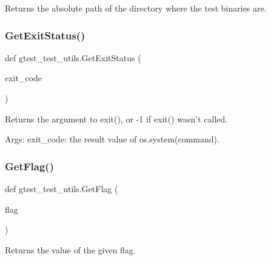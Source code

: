 \begin{DoxyVerb}Returns the absolute path of the directory where the test binaries are.\end{DoxyVerb}
 \mbox{\label{namespacegtest__test__utils_acf8280de4dc027a28ffc9de43f245b50}} 
\subsubsection{\texorpdfstring{Get\+Exit\+Status()}{GetExitStatus()}}
{\footnotesize\ttfamily def gtest\+\_\+test\+\_\+utils.\+Get\+Exit\+Status (\begin{DoxyParamCaption}\item[{}]{exit\+\_\+code }\end{DoxyParamCaption})}

\begin{DoxyVerb}Returns the argument to exit(), or -1 if exit() wasn't called.

Args:
  exit_code: the result value of os.system(command).
\end{DoxyVerb}
 \mbox{\label{namespacegtest__test__utils_a052da74a5e39162480daf3a4d8eff9a6}} 
\subsubsection{\texorpdfstring{Get\+Flag()}{GetFlag()}}
{\footnotesize\ttfamily def gtest\+\_\+test\+\_\+utils.\+Get\+Flag (\begin{DoxyParamCaption}\item[{}]{flag }\end{DoxyParamCaption})}

\begin{DoxyVerb}Returns the value of the given flag.\end{DoxyVerb}
 \mbox{\label{namespacegtest__test__utils_aaff66cb0980804d8bd57dc719d4b5518}} 
